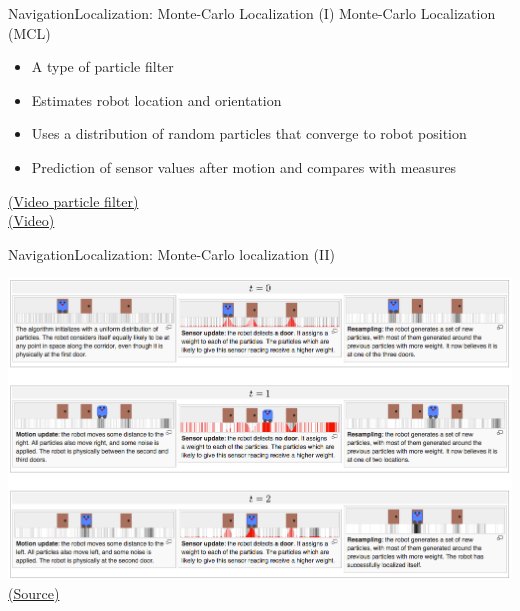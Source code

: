 \documentclass[10pt,compress]{beamer} %
\begin{document}
\begin{frame}{Navigation}{Localization: Monte-Carlo Localization (I)}
	Monte-Carlo Localization (MCL)
	\begin{itemize}
		\item A type of particle filter
		\item Estimates robot location and orientation
		\item Uses a distribution of random particles that converge to robot position
		\item Prediction of sensor values after motion and compares with measures
	\end{itemize}	
	\href{https://www.youtube.com/watch?v=aUkBa1zMKv4}{(Video particle filter)}\\
	\href{https://www.youtube.com/watch?v=lCXv4yOcwf8}{(Video)}
\end{frame}

\begin{frame}{Navigation}{Localization: Monte-Carlo localization (II)}
	\begin{center}
	 	\includegraphics[width=\linewidth]{figs/montecarlo.png}\\
		\tiny{\href{https://en.wikipedia.org/wiki/Monte_Carlo_localization}{(Source)}}
	\end{center}
\end{frame}
\end{document}

